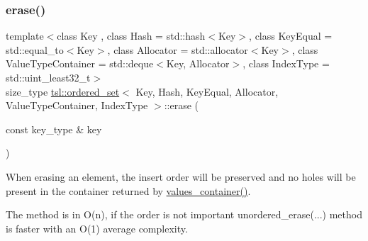 \subsubsection{\texorpdfstring{erase()}{erase()}\hspace{0.1cm}{\footnotesize\ttfamily [4/7]}}
{\footnotesize\ttfamily template$<$class Key , class Hash  = std\+::hash$<$\+Key$>$, class Key\+Equal  = std\+::equal\+\_\+to$<$\+Key$>$, class Allocator  = std\+::allocator$<$\+Key$>$, class Value\+Type\+Container  = std\+::deque$<$\+Key, Allocator$>$, class Index\+Type  = std\+::uint\+\_\+least32\+\_\+t$>$ \\
size\+\_\+type \mbox{\hyperlink{classtsl_1_1ordered__set}{tsl\+::ordered\+\_\+set}}$<$ Key, Hash, Key\+Equal, Allocator, Value\+Type\+Container, Index\+Type $>$\+::erase (\begin{DoxyParamCaption}\item[{const key\+\_\+type \&}]{key }\end{DoxyParamCaption})\hspace{0.3cm}{\ttfamily [inline]}}





When erasing an element, the insert order will be preserved and no holes will be present in the container returned by \textquotesingle{}\mbox{\hyperlink{classtsl_1_1ordered__set_a1bc951514a5c4c29c14b6cf5177cf1ec}{values\+\_\+container()}}\textquotesingle{}.

The method is in O(n), if the order is not important \textquotesingle{}unordered\+\_\+erase(...)\textquotesingle{} method is faster with an O(1) average complexity. \mbox{\label{classtsl_1_1ordered__set_a35895b2267b33386efdc0ccf2b262154}} 
